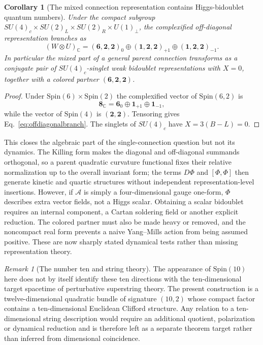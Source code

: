 \documentclass[11pt]{article}
\newtheorem{corollary}[theorem]{Corollary}
\theoremstyle{definition}\newtheorem{definition}[theorem]{Definition}
\theoremstyle{remark}\newtheorem{remark}[theorem]{Remark}\newtheorem{conjecture}[theorem]{Conjecture}
\begin{document}
\begin{corollary}[The mixed connection representation contains Higgs-bidoublet quantum numbers]\label{cor:connectionbidoublet}
Under the compact subgroup
$SU(4)_c\times SU(2)_L\times SU(2)_R\times U(1)_\perp$, the complexified off-diagonal representation branches as
\begin{equation}\label{eq:offdiagonalbranch}
 \boxed{
 (W\otimes U)_{\mathbb C}
 = (\mathbf6,\mathbf2,\mathbf2)_0
 \oplus(\mathbf1,\mathbf2,\mathbf2)_{+1}
 \oplus(\mathbf1,\mathbf2,\mathbf2)_{-1}.}
\end{equation}
In particular the mixed part of a general parent connection transforms as a conjugate pair of
$SU(4)_c$-singlet weak bidoublet representations with $X=0$, together with a colored partner $(\mathbf6,\mathbf2,\mathbf2)$.
\end{corollary}
\begin{proof}
Under $\mathrm{Spin}(6)\times\mathrm{Spin}(2)$ the complexified vector of $\mathrm{Spin}(6,2)$ is
\begin{equation}
 \mathbf8_{\mathbb C}=\mathbf6_0\oplus\mathbf1_{+1}\oplus\mathbf1_{-1},
\end{equation}
while the vector of $\mathrm{Spin}(4)$ is $(\mathbf2,\mathbf2)$. Tensoring gives Eq.~\eqref{eq:offdiagonalbranch}. The singlets of $SU(4)_c$ have $X=3(B-L)=0$.
\end{proof}

This closes the algebraic part of the single-connection question but not its dynamics. The Killing form makes the diagonal and off-diagonal summands orthogonal, so a parent quadratic curvature functional fixes their relative normalization up to the overall invariant form; the terms $D\Phi$ and $[\Phi,\Phi]$ then generate kinetic and quartic structures without independent representation-level insertions. However, if $\mathcal A$ is simply a four-dimensional gauge one-form, $\Phi$ describes extra vector fields, not a Higgs scalar. Obtaining a scalar bidoublet requires an internal component, a Cartan soldering field or another explicit reduction. The colored partner must also be made heavy or removed, and the noncompact real form prevents a naive Yang--Mills action from being assumed positive. These are now sharply stated dynamical tests rather than missing representation theory.

\begin{remark}[The number ten and string theory]
The appearance of $\mathrm{Spin}(10)$ here does not by itself identify these ten directions with the ten-dimensional target spacetime of perturbative superstring theory. The present construction is a twelve-dimensional quadratic bundle of signature $(10,2)$ whose compact factor contains a ten-dimensional Euclidean Clifford structure. Any relation to a ten-dimensional string description would require an additional quotient, polarization or dynamical reduction and is therefore left as a separate theorem target rather than inferred from dimensional coincidence.
\end{remark}
\end{document}
